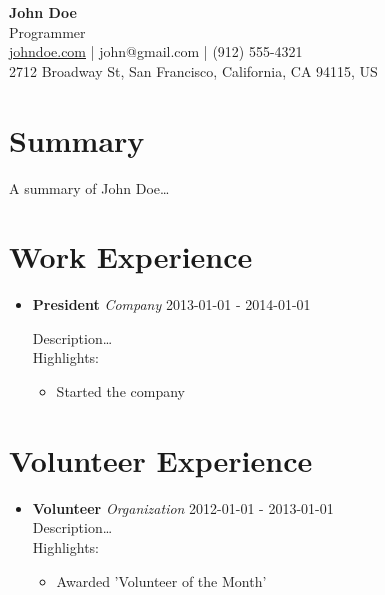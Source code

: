 \documentclass{article}
\newcommand{\entry}[2]{
    \textbf{#1} \hfill \textit{#2}
}
\begin{document}
\begin{flushleft}
    \textbf{\LARGE John Doe} \\
    Programmer \\
    \href{https://johndoe.com}{johndoe.com} | john@gmail.com | (912) 555-4321 \\
    2712 Broadway St, San Francisco, California, CA 94115, US
\end{flushleft}
\section*{Summary}
A summary of John Doe…\\
		

\section*{Work Experience}
\begin{itemize}[leftmargin=*]
		
  \item \entry{President}{Company} \hfill 2013-01-01 - 2014-01-01 

	\vspace{0.1in}

	Description… \\
	Highlights:
	\begin{itemize}
				
		\item Started the company				
					
	\end{itemize}
	\vspace{0.2in}
			
\end{itemize}
		

\section*{Volunteer Experience}
\begin{itemize}[leftmargin=*]
		
	\item \entry{Volunteer}{Organization} \hfill 2012-01-01 - 2013-01-01 \\
	Description… \\
	Highlights:
	\begin{itemize}
				
		\item Awarded 'Volunteer of the Month'
					
	\end{itemize}
			\end{itemize}
\end{document}
